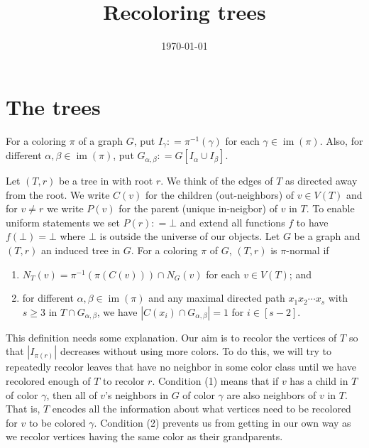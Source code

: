 \documentclass[12pt]{article}
\title{Recoloring trees}
\author{}
\date{\today}
\theoremstyle{plain}
\theoremstyle{definition}
\theoremstyle{remark}
\newcommand{\card}[1]{\left|#1\right|}
\newcommand{\irange}[1]{\left[#1\right]}
\newcommand{\brackets}[1]{\left[ #1 \right]}
\newcommand{\DefinedAs}{\mathrel{\mathop:}=}
\newcommand{\im}{\operatorname{im}}
\begin{document}
\maketitle

\section{The trees}
For a coloring $\pi$ of a graph $G$, put $I_\gamma \DefinedAs \pi^{-1}(\gamma)$ for each $\gamma \in \im(\pi)$.  Also, for different $\alpha, \beta \in \im(\pi)$, put $G_{\alpha, \beta} \DefinedAs G\brackets{I_\alpha \cup I_\beta}$.

Let $(T, r)$ be a tree in with root $r$.  We think of the edges of $T$ as directed away from the root. We write $C(v)$ for the children (out-neighbors) of $v \in V(T)$ and for $v \neq r$ we write $P(v)$ for the parent (unique in-neigbor) of $v$ in $T$. To enable uniform statements we set $P(r) \DefinedAs \bot$ and extend all functions $f$ to have $f(\bot) = \bot$ where $\bot$ is outside the universe of our objects. Let $G$ be a graph and $(T, r)$ an induced tree in $G$. For a coloring $\pi$ of $G$, $(T, r)$ is $\pi$-normal if 
\begin{enumerate}
\item $N_T(v) = \pi^{-1}(\pi(C(v))) \cap N_G(v)$ for each $v \in V(T)$; and
\item for different $\alpha, \beta \in \im(\pi)$ and any maximal directed path $x_1x_2\cdots x_s$ with $s \geq 3$ in $T \cap G_{\alpha, \beta}$, we have $\card{C(x_i) \cap G_{\alpha, \beta}} = 1$ for $i \in \irange{s-2}$.
\end{enumerate}

This definition needs some explanation.  Our aim is to recolor the vertices of $T$ so that $\card{I_{\pi(r)}}$ decreases without using more colors. To do this, we will try to repeatedly recolor leaves that have no neighbor in some color class until we have recolored enough of $T$ to recolor $r$. Condition (1) means that if $v$ has a child in $T$ of color $\gamma$, then all of $v$'s neighbors in $G$ of color $\gamma$ are also neighbors of $v$ in $T$.  That is, $T$ encodes all the information about what vertices need to be recolored for $v$ to be colored $\gamma$.  Condition (2) prevents us from getting in our own way as we recolor vertices having the same color as their grandparents.
\end{document}
